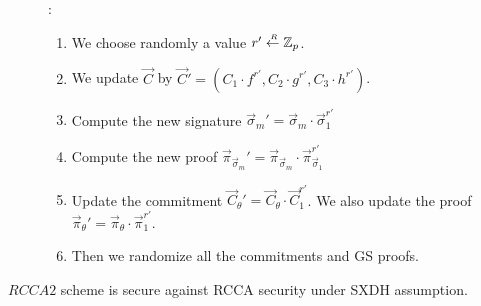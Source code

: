 \begin{description}
\item[]:
  \begin{enumerate}
  \item We choose randomly a value $r' \stackrel{{\scriptscriptstyle \mkern4mu R}}{\gets} \mathbb{Z}_p$.
  \item We update $\vec{C}$ by $\vec{C}'  = (C_1 \cdot f^{r'}, C_2 \cdot g^{r'}, C_3 \cdot h^{r'})$.
  \item Compute the new signature $\vec{\sigma}_m' = \vec{\sigma}_m \cdot \vec{\sigma}_1^{r'}$
  \item Compute the new proof $\vec{\pi}_{\vec{\sigma}_m}' = \vec{\pi}_{\vec{\sigma}_m} \cdot \vec{\pi}_{\vec{\sigma}_1}^{r'}$
  \item Update the commitment $\vec{C}_{\theta}' = \vec{C}_{\theta} \cdot \vec{C}_{1}^{r'}$. We also update the proof $\vec{\pi}_{\theta}' = \vec{\pi}_{\theta} \cdot \vec{\pi}_{1}^{r'}$.
  \item Then we randomize all the commitments and GS proofs.
  \end{enumerate}
  
\end{description}


\begin{myTh}
  $RCCA2$ scheme is secure against RCCA security under SXDH assumption.
\end{myTh}

